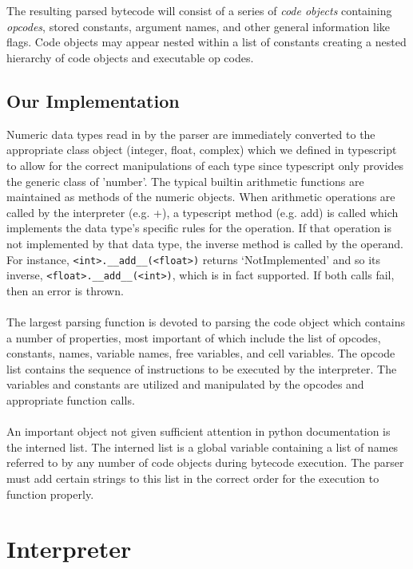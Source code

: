 \documentclass{article}
\begin{document}
\\\\
The resulting parsed bytecode will consist of a series of {\em code objects} containing {\em opcodes}, stored constants, argument names, and other general information like flags.  Code objects may appear nested within a list of constants creating a nested hierarchy of code objects and executable op codes.

\subsection{Our Implementation}

Numeric data types read in by the parser are immediately converted to the appropriate class object (integer, float, complex) which we defined in typescript to allow for the correct manipulations of each type since typescript only provides the generic class of 'number'. The typical builtin arithmetic functions are maintained as methods of the numeric objects.  When arithmetic operations are called by the interpreter (e.g. +), a typescript method (e.g. add) is called which implements the data type's specific rules for the operation.  If that operation is not implemented by that data type, the inverse method is called by the operand. For instance, \verb!<int>.__add__(<float>)! returns `NotImplemented' and so its inverse, \verb!<float>.__add__(<int>)!, which is in fact supported.  If both calls fail, then an error is thrown.\\
\\
The largest parsing function is devoted to parsing the code object which contains a number of properties, most important of which include the list of opcodes, constants, names, variable names, free variables, and cell variables.  The opcode list contains the sequence of instructions to be executed by the interpreter. The variables and constants are utilized and manipulated by the opcodes and appropriate function calls.\\
\\
An important object not given sufficient attention in python documentation is the interned list.  The interned list is a global variable containing a list of names referred to by any number of code objects during bytecode execution.  The parser must add certain strings to this list in the correct order for the execution to function properly.

\section{Interpreter}
\end{document}
